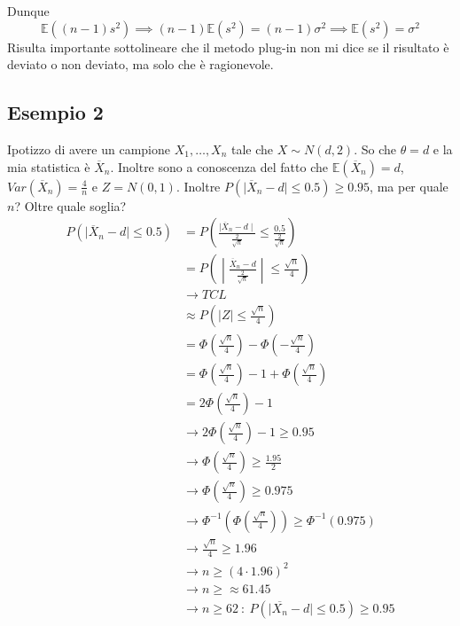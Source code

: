 \documentclass[11pt]{report}
\begin{document}
Dunque
\begin{equation}
	\mathbb{E} \left( (n-1)s^2 \right) \implies (n-1) \mathbb{E} \left( s^2 \right) = (n-1) \sigma^2 \implies \mathbb{E} \left( s^2 \right) = \sigma^2
\end{equation}
Risulta importante sottolineare che il metodo plug-in non mi dice se il risultato è deviato o non deviato, ma solo che è ragionevole.
\subsection{Esempio 2}
Ipotizzo di avere un campione $X_1, \dots, X_n$ tale che $X \sim N(d,2)$. So che $\theta = d$ e la mia statistica è $\overline{X}_n$. Inoltre sono a conoscenza del fatto che $\mathbb{E} \left( \overline{X}_n \right) = d$, $Var\left( \overline{X}_n \right) = \frac{4}{n}$ e $Z = N(0,1)$. Inoltre $P \left( \mid \overline{X}_n - d \mid \leq 0.5 \right) \geq 0.95$, ma per quale $n$? Oltre quale soglia?
\begin{equation}
    \begin{split}
        P \left( \mid \overline{X}_n - d \mid \leq 0.5 \right) & = P \left( \frac{\mid \overline{X}_n - d \mid}{\frac{2}{\sqrt{n}}} \leq \frac{0.5}{{\frac{2}{\sqrt{n}}}} \right)\\
        & = P \left( \middle| \frac{\overline{X}_n - d}{\frac{2}{\sqrt{n}}} \middle| \leq \frac{\sqrt{n}}{4} \right)\\
        & \rightarrow TCL\\
        & \approx P \left( \mid Z \mid \leq \frac{\sqrt{n}}{4} \right)\\
        & = \Phi \left( \frac{\sqrt{n}}{4} \right) - \Phi \left( - \frac{\sqrt{n}}{4} \right)\\
        & = \Phi \left( \frac{\sqrt{n}}{4} \right) - 1 + \Phi \left( \frac{\sqrt{n}}{4} \right)\\
        & = 2 \Phi \left( \frac{\sqrt{n}}{4} \right) - 1\\
        & \rightarrow 2 \Phi \left( \frac{\sqrt{n}}{4} \right) - 1 \geq 0.95\\
        & \rightarrow \Phi \left( \frac{\sqrt{n}}{4} \right) \geq \frac{1.95}{2}\\
        & \rightarrow \Phi \left( \frac{\sqrt{n}}{4} \right) \geq 0.975\\
        & \rightarrow \Phi^{-1} \left( \Phi \left( \frac{\sqrt{n}}{4} \right) \right) \geq \Phi^{-1}(0.975)\\
        & \rightarrow \frac{\sqrt{n}}{4} \geq 1.96\\
        & \rightarrow n \geq (4 \cdot 1.96)^2\\
        & \rightarrow n \geq \approx 61.45\\
        & \rightarrow n \geq 62\ :\ P \left( \mid \overline{X_n} - d \mid \leq 0.5 \right) \geq 0.95
    \end{split}
\end{equation}
\end{document}
